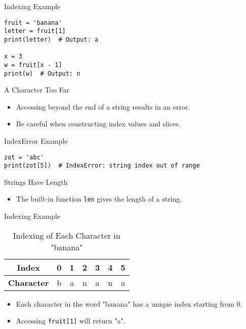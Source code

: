 \documentclass[serif, aspectratio=169]{beamer}
\begin{document}
\begin{frame}[fragile]{Indexing Example}
    \begin{lstlisting}
fruit = 'banana'
letter = fruit[1]
print(letter)  # Output: a

x = 3
w = fruit[x - 1]
print(w)  # Output: n
    \end{lstlisting}
\end{frame}

\begin{frame}{A Character Too Far}
    \begin{itemize}
        \item Accessing beyond the end of a string results in an error.
        \item Be careful when constructing index values and slices.
    \end{itemize}
\end{frame}

\begin{frame}[fragile]{IndexError Example}
    \begin{lstlisting}
zot = 'abc'
print(zot[5])  # IndexError: string index out of range
    \end{lstlisting}
\end{frame}

\begin{frame}{Strings Have Length}
    \begin{itemize}
        \item The built-in function \texttt{len} gives the length of a string.
    \end{itemize}
\end{frame}

\begin{frame}{Indexing Example}
    \begin{table}[]
        \centering
        \begin{tabular}{c|c|c|c|c|c|c}
            \textbf{Index} & 0 & 1 & 2 & 3 & 4 & 5 \\
            \hline
            \textbf{Character} & b & a & n & a & n & a \\
        \end{tabular}
        \caption{Indexing of Each Character in "banana"}
    \end{table}
    \vspace{0.5cm}
    \begin{itemize}
        \item Each character in the word "banana" has a unique index starting from 0.
        \item Accessing \texttt{fruit[1]} will return "a".
    \end{itemize}
\end{frame}
\end{document}

